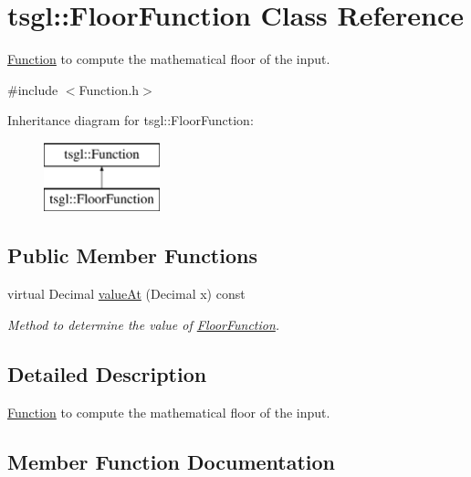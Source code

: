 \hypertarget{classtsgl_1_1_floor_function}{}\section{tsgl\+:\+:Floor\+Function Class Reference}
\label{classtsgl_1_1_floor_function}


\hyperlink{classtsgl_1_1_function}{Function} to compute the mathematical floor of the input.  




{\ttfamily \#include $<$Function.\+h$>$}

Inheritance diagram for tsgl\+:\+:Floor\+Function\+:\begin{figure}[H]
\begin{center}
\leavevmode
\includegraphics[height=2.000000cm]{classtsgl_1_1_floor_function}
\end{center}
\end{figure}
\subsection*{Public Member Functions}
\begin{DoxyCompactItemize}
\item 
virtual Decimal \hyperlink{classtsgl_1_1_floor_function_a28fae5b310ae965348fb2eaec50fd5c8}{value\+At} (Decimal x) const
\begin{DoxyCompactList}\small\item\em Method to determine the value of \hyperlink{classtsgl_1_1_floor_function}{Floor\+Function}. \end{DoxyCompactList}\end{DoxyCompactItemize}


\subsection{Detailed Description}
\hyperlink{classtsgl_1_1_function}{Function} to compute the mathematical floor of the input. 

\subsection{Member Function Documentation}
\mbox{\label{classtsgl_1_1_floor_function_a28fae5b310ae965348fb2eaec50fd5c8}} 
